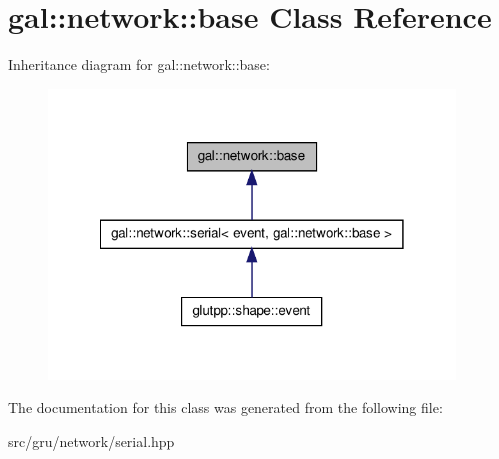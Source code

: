 \hypertarget{classgal_1_1network_1_1base}{\section{gal\-:\-:network\-:\-:base \-Class \-Reference}
\label{classgal_1_1network_1_1base}
}


\-Inheritance diagram for gal\-:\-:network\-:\-:base\-:
\nopagebreak
\begin{figure}[H]
\begin{center}
\leavevmode
\includegraphics[width=306pt]{classgal_1_1network_1_1base__inherit__graph}
\end{center}
\end{figure}


\-The documentation for this class was generated from the following file\-:\begin{DoxyCompactItemize}
\item 
src/gru/network/serial.\-hpp\end{DoxyCompactItemize}
